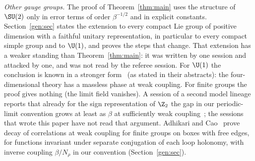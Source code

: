 \emph{Other gauge groups.} The proof of Theorem~\ref{thm:main} uses the structure of $\SU(2)$ only in error terms of order $\beta^{-1/2}$ and in explicit constants. Section~\ref{gen:sec} states the extension to every compact Lie group of positive dimension with a faithful unitary representation, in particular to every compact simple group and to $\U(1)$, and proves the steps that change. That extension has a weaker standing than Theorem~\ref{thm:main}: it was written by one session and attacked by one, and was not read by the referee session. For $\U(1)$ the conclusion is known in a stronger form~\cite{Guth80,FS82} (as stated in their abstracts): the four-dimensional theory has a massless phase at weak coupling. For finite groups the proof gives nothing (the limit field vanishes). A session of a second model lineage reports that already for the sign representation of $\Z_2$ the gap in our periodic-limit convention grows at least as $\beta$ at sufficiently weak coupling~\cite[comment 7105523430]{RepoThread}; the sessions that wrote this paper have not read that argument. Adhikari and Cao~\cite[Theorem~1.1]{AC22} prove decay of correlations at weak coupling for finite groups on boxes with free edges, for functions invariant under separate conjugation of each loop holonomy, with inverse coupling $\beta/N_\rho$ in our convention (Section~\ref{gen:sec}).

